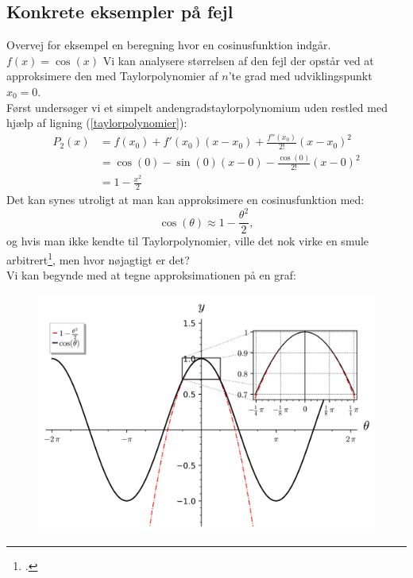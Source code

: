 \documentclass[12pt, a4paper]{article}
\begin{document}
\begin{refsection}
\subsection{Konkrete eksempler på fejl} %
Overvej for eksempel en beregning hvor en cosinusfunktion indgår. $f(x)=\cos(x)$ Vi kan analysere størrelsen af den fejl der opstår ved at approksimere den med Taylorpolynomier af $n$'te grad med udviklingspunkt $x_0=0$.\\
Først undersøger vi et simpelt andengradstaylorpolynomium uden restled med hjælp af ligning (\ref{taylorpolynomier}):\\
 \begin{equation*}
    \begin{aligned}
        P_2(x)&=f(x_0)+f'(x_0)(x-x_0)+\frac{f''(x_0)}{2!}(x-x_0)^2\\
        &=\cos(0)-\sin(0)(x-0)-\frac{\cos(0)}{2!}(x-0)^2\\
        &=1-\frac{x^2}{2}
    \end{aligned}
\end{equation*}
Det kan synes utroligt at man kan approksimere en cosinusfunktion med:
\begin{equation*}\label{cosiunsanden}
    \cos(\theta)\approx 1-\frac{\theta^2}{2},
\end{equation*}
og hvis man ikke kendte til Taylorpolynomier, ville det nok virke en smule arbitrert\footcite{3blue1browntaylor}, men hvor nøjagtigt er det?\\
Vi kan begynde med at tegne approksimationen på en graf:
\begin{figure}[h!]
     \includegraphics[width=\textwidth]{figures/cosinuszoom.png}

\end{figure}
\end{refsection}
\end{document}
